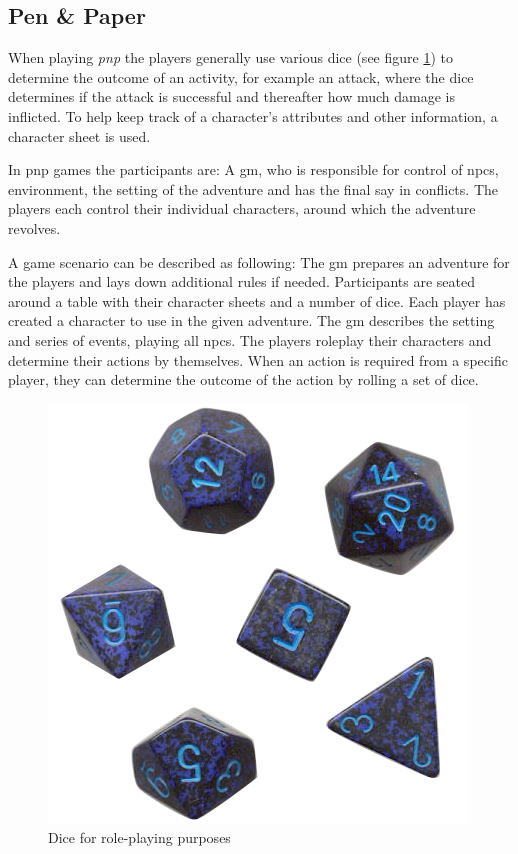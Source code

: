 \subsection{Pen \& Paper}
When playing \emph{\ac{pnp}} the players generally use various dice (see figure \ref{dice}) to determine the outcome of an activity, for example an attack, where the dice determines if the attack is successful and thereafter how much damage is inflicted. To help keep track of a character's attributes and other information, a character sheet is used.

In \ac{pnp} games the participants are: A \ac{gm}, who is responsible for control of \ac{npc}s, environment, the setting of the adventure and has the final say in conflicts. The players each control their individual characters, around which the adventure revolves.

A game scenario can be described as following: The \ac{gm} prepares an adventure for the players and lays down additional rules if needed. Participants are seated around a table with their character sheets and a number of dice. Each player has created a character to use in the given adventure. The \ac{gm} describes the setting and series of events, playing all \ac{npc}s. The players roleplay their characters and determine their actions by themselves. When an action is required from a specific player, they can determine the outcome of the action by rolling a set of dice.
\begin{figure}[!h]
\centering
\includegraphics[scale=0.35]{img/rpgdice.png}
\caption{Dice for role-playing purposes}
\label{dice}
\end{figure}

